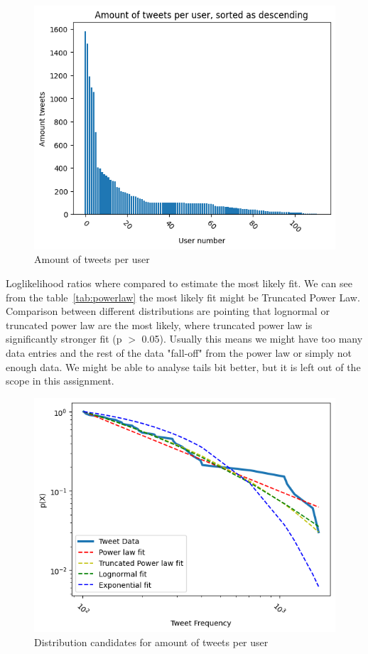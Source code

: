 \documentclass[conference]{IEEEtran}
\begin{document}
    \begin{figure}
        \includegraphics[scale=0.6]{figures/amount_tweets_per_user}
        \caption{Amount of tweets per user}
        \label{fig:amount-tweets-user}
    \end{figure}

    Loglikelihood ratios where compared to estimate the most likely fit.
    We can see from the table~\ref{tab:powerlaw} the most likely fit might be Truncated Power Law.
    Comparison between different distributions are pointing that lognormal or truncated power law are the most likely, where truncated power law is significantly stronger fit (p $>$ 0.05).
    Usually this means we might have too many data entries and the rest of the data "fall-off" from the power law or simply not enough data.
    We might be able to analyse tails bit better, but it is left out of the scope in this assignment.

    \begin{figure}
        \includegraphics[scale=0.5]{figures/amount_tweets_powerlaw}
        \caption{Distribution candidates for amount of tweets per user}
        \label{fig:amount-tweets-powerlaw}
    \end{figure}
\end{document}
